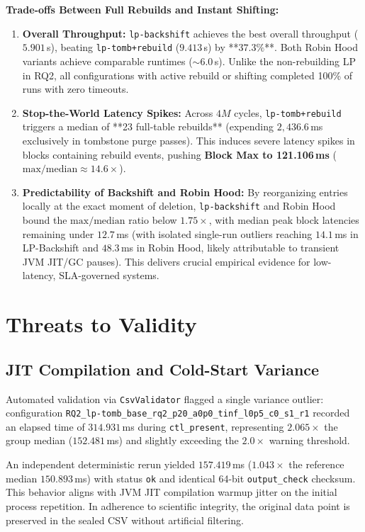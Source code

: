 \documentclass[twocolumn, 10pt, a4paper]{article}
\begin{document}
\textbf{Trade-offs Between Full Rebuilds and Instant Shifting:}
\begin{enumerate}
    \item \textbf{Overall Throughput:} \texttt{lp-backshift} achieves the best overall throughput ($5.901$\,s), beating \texttt{lp-tomb+rebuild} ($9.413$\,s) by **$37.3\%$**. Both Robin Hood variants achieve comparable runtimes ($\sim 6.0$\,s). Unlike the non-rebuilding LP in RQ2, all configurations with active rebuild or shifting completed 100\% of runs with zero timeouts.
    \item \textbf{Stop-the-World Latency Spikes:} Across $4M$ cycles, \texttt{lp-tomb+rebuild} triggers a median of **23 full-table rebuilds** (expending $2,436.6$\,ms exclusively in tombstone purge passes). This induces severe latency spikes in blocks containing rebuild events, pushing \textbf{Block Max to 121.106\,ms} ($\text{max}/\text{median} \approx 14.6\times$).
    \item \textbf{Predictability of Backshift and Robin Hood:} By reorganizing entries locally at the exact moment of deletion, \texttt{lp-backshift} and Robin Hood bound the $\text{max}/\text{median}$ ratio below $1.75\times$, with median peak block latencies remaining under $12.7$\,ms (with isolated single-run outliers reaching $14.1$\,ms in LP-Backshift and $48.3$\,ms in Robin Hood, likely attributable to transient JVM JIT/GC pauses). This delivers crucial empirical evidence for low-latency, SLA-governed systems.
\end{enumerate}

\section{Threats to Validity}
\subsection{JIT Compilation and Cold-Start Variance}
Automated validation via \texttt{CsvValidator} flagged a single variance outlier: configuration \texttt{RQ2\_lp-tomb\_base\_rq2\_p20\_a0p0\_tinf\_l0p5\_c0\_s1\_r1} recorded an elapsed time of $314.931$\,ms during \texttt{ctl\_present}, representing $2.065\times$ the group median ($152.481$\,ms) and slightly exceeding the $2.0\times$ warning threshold.

An independent deterministic rerun yielded $157.419$\,ms ($1.043\times$ the reference median $150.893$\,ms) with status \texttt{ok} and identical 64-bit \texttt{output\_check} checksum. This behavior aligns with JVM JIT compilation warmup jitter on the initial process repetition. In adherence to scientific integrity, the original data point is preserved in the sealed CSV without artificial filtering.
\end{document}

